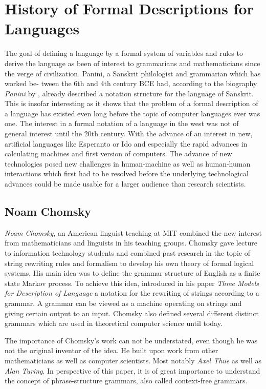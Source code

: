 \documentclass{article}
\begin{document}
\section{History of Formal Descriptions for Languages}
The goal of defining a language by a formal system of variables and rules to derive the language as been of interest to grammarians and mathematicians since the verge of civilization. Panini, a Sanskrit philologist and grammarian which has worked be- tween the 6th and 4th century BCE had, according to the biography \textit{Panini} by \citet{bhate2002panini}, already described a notation structure for the language of Sanskrit. This is insofar interesting as it shows that the problem of a formal description of a language has existed even long before the topic of computer languages ever was one. The interest in a formal notation of a language in the west was not of general interest until the 20th century. With the advance of an interest in new, artificial languages like Esperanto or Ido and especially the rapid advances in calculating machines and first version of computers. The advance of new technologies posed new challenges in human-machine as well as human-human interactions which first had to be resolved before the underlying technological advances could be made usable for a larger audience than research scientists.

\subsection{Noam Chomsky}
\textit{Noam Chomsky}, an American linguist teaching at MIT combined the new interest from mathematicians and linguists in his teaching groups. Chomsky gave lecture to information technology students and combined past research in the topic of string rewriting rules and formalism to develop his own theory of formal logical systems. His main idea was to define the grammar structure of English as a finite state Markov process. To achieve this idea, \citet{1056813} introduced in his paper \textit{Three Models for Description of Language} a notation for the rewriting of strings according to a grammar. A grammar can be viewed as a machine operating on strings and giving certain output to an input. Chomsky also defined several different distinct grammars which are used in theoretical computer science until today.

The importance of Chomsky’s work can not be understated, even though he was not the original inventor of the idea. He built upon work from other mathematicians as well as computer scientists. Most notably \textit{Axel Thue} as well as \textit{Alan Turing}. In perspective of this paper, it is of great importance to understand the concept of phrase-structure grammars, also called context-free grammars.
\end{document}
